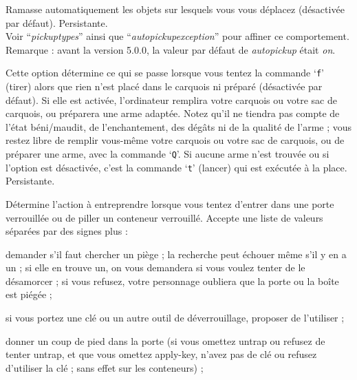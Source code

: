 \documentclass[titlepage]{article}
\begin{document}
\begin{description}[font=\mdseries\itshape]
\item[autopickup]
Ramasse automatiquement les objets sur lesquels vous vous déplacez (désactivée par défaut).
Persistante.
\\
Voir ``\textit{pickup\textunderscore types}'' ainsi que
``\textit{autopickup\textunderscore exception}'' pour affiner ce comportement.
\\
Remarque : avant la version 5.0.0, la valeur par défaut de \textit{autopickup} était \textit{on}.
\item[autoquiver]
Cette option détermine ce qui se passe lorsque vous tentez la commande `\texttt{f}' (tirer)
alors que rien n'est placé dans le carquois ni préparé (désactivée par défaut).
Si elle est activée, l'ordinateur remplira
votre carquois ou votre sac de carquois, ou préparera une arme adaptée.
Notez qu'il ne tiendra pas
compte de l'état béni/maudit, de l'enchantement, des dégâts ni de la
qualité de l'arme ; vous restez libre de remplir vous-même votre carquois
ou votre sac de carquois, ou de préparer une arme,
avec la commande `\texttt{Q}'.
Si aucune arme n'est trouvée ou si l'option est
désactivée, c'est la commande `\texttt{t}' (lancer) qui est exécutée à la place. Persistante.
\item[autounlock]
Détermine l'action à entreprendre lorsque vous tentez d'entrer dans une porte verrouillée
ou de piller un conteneur verrouillé.
Accepte une liste de valeurs séparées par des signes plus :
\newlength{\auwidth}
\addtolength{\auwidth}{\labelsep}
\begin{description}[leftmargin=\auwidth, topsep=1mm, itemsep=0mm, labelwidth=*, font=\ttfamily, align=right]
\item[Untrap]
demander s'il faut chercher un piège ;
la recherche peut échouer même s'il y en a un ; si elle en trouve un, on
vous demandera si vous voulez tenter de le désamorcer ; si vous refusez,
votre personnage oubliera que la porte ou la boîte est piégée ;
\item[Apply-Key]
si vous portez une clé ou un autre outil de déverrouillage, proposer de l'utiliser ;
\item[Kick]
donner un coup de pied dans la porte (si vous omettez untrap ou refusez de tenter
untrap, et que vous omettez apply-key, n'avez pas de clé ou refusez d'utiliser la clé ;
sans effet sur les conteneurs) ;
\item[Force]

\end{description}
\end{description}
\end{document}
